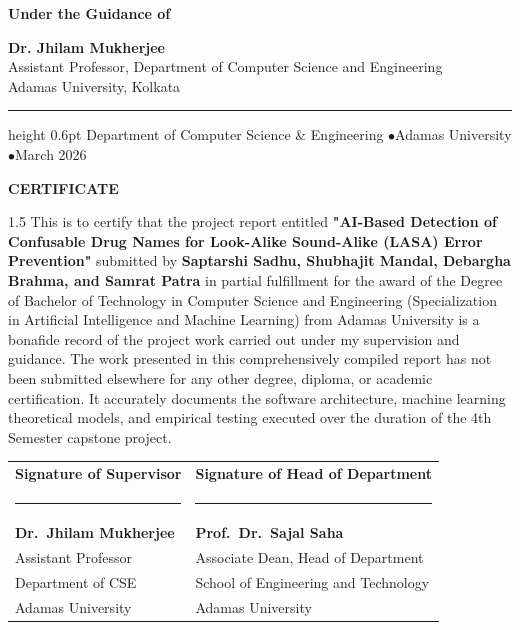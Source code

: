 \documentclass[12pt,a4paper]{report}
\begin{document}
\begin{titlepage}
\begin{center}
\vspace{10pt}

{\large\textbf{Under the Guidance of}}

\vspace{8pt}
{\large\textbf{Dr. Jhilam Mukherjee}}\\[3pt]
{\normalsize Assistant Professor, Department of Computer Science and Engineering}\\[2pt]
{\normalsize Adamas University, Kolkata}

\vfill

\hrule height 0.6pt
\vspace{8pt}
{\normalsize Department of Computer Science \& Engineering \enspace$\bullet$\enspace Adamas University \enspace$\bullet$\enspace March 2026}

\end{center}
\end{titlepage}

\clearpage
\thispagestyle{plain}
\begin{center}
  {\Large\textbf{CERTIFICATE}}
\end{center}
\vspace{16pt}

\begin{spacing}{1.5}
This is to certify that the project report entitled \textbf{"AI-Based Detection of Confusable Drug Names for Look-Alike Sound-Alike (LASA) Error Prevention"} submitted by \textbf{Saptarshi Sadhu, Shubhajit Mandal, Debargha Brahma, and Samrat Patra} in partial fulfillment for the award of the Degree of Bachelor of Technology in Computer Science and Engineering (Specialization in Artificial Intelligence and Machine Learning) from Adamas University is a bonafide record of the project work carried out under my supervision and guidance. The work presented in this comprehensively compiled report has not been submitted elsewhere for any other degree, diploma, or academic certification. It accurately documents the software architecture, machine learning theoretical models, and empirical testing executed over the duration of the 4th Semester capstone project.
\end{spacing}

\vspace{36pt}
\noindent
\begin{tabular}{@{}p{} p{}@{}}
  \textbf{Signature of Supervisor} & \textbf{Signature of Head of Department}\\[28pt]
  \rule{6.5cm}{0.4pt} & \rule{6.5cm}{0.4pt}\\[4pt]
  \textbf{Dr.\ Jhilam Mukherjee} & \textbf{Prof.\ Dr.\ Sajal Saha}\\
  Assistant Professor & Associate Dean, Head of Department\\
  Department of CSE & School of Engineering and Technology\\
  Adamas University & Adamas University\\
\end{tabular}
\end{document}

